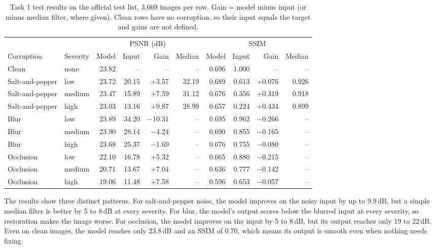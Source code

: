 \documentclass[conference]{IEEEtran}
\begin{document}
\begin{table}[t]
\centering
\caption{Task 1 test results on the official test list, 3{,}669 images per row. Gain = model minus
input (or minus median filter, where given). Clean rows have no corruption, so their input equals the
target and gains are not defined.}
\label{tab:t1results}
\small
\begin{tabular}{@{}llrrrrrrrr@{}}
\toprule
 & & \multicolumn{4}{c}{PSNR (dB)} & \multicolumn{4}{c}{SSIM} \\
\cmidrule(lr){3-6}\cmidrule(lr){7-10}
Corruption & Severity & Model & Input & Gain & Median & Model & Input & Gain & Median \\
\midrule
Clean & none & 23.82 & -- & -- & -- & 0.696 & 1.000 & -- & -- \\
Salt-and-pepper & low & 23.72 & 20.15 & +3.57 & 32.19 & 0.689 & 0.613 & +0.076 & 0.926 \\
Salt-and-pepper & medium & 23.47 & 15.89 & +7.59 & 31.12 & 0.676 & 0.356 & +0.319 & 0.918 \\
Salt-and-pepper & high & 23.03 & 13.16 & +9.87 & 28.99 & 0.657 & 0.224 & +0.434 & 0.899 \\
Blur & low & 23.89 & 34.20 & $-$10.31 & -- & 0.695 & 0.962 & $-$0.266 & -- \\
Blur & medium & 23.90 & 28.14 & $-$4.24 & -- & 0.690 & 0.855 & $-$0.165 & -- \\
Blur & high & 23.68 & 25.37 & $-$1.69 & -- & 0.676 & 0.755 & $-$0.080 & -- \\
Occlusion & low & 22.10 & 16.78 & +5.32 & -- & 0.665 & 0.880 & $-$0.215 & -- \\
Occlusion & medium & 20.71 & 13.67 & +7.04 & -- & 0.636 & 0.777 & $-$0.142 & -- \\
Occlusion & high & 19.06 & 11.48 & +7.58 & -- & 0.596 & 0.653 & $-$0.057 & -- \\
\bottomrule
\end{tabular}
\end{table}

The results show three distinct patterns. For salt-and-pepper noise, the model improves on the noisy input
by up to 9.9\,dB, but a simple median filter is better by 5 to 8\,dB at every severity. For blur, the
model's output scores below the blurred input at every severity, so restoration makes the image worse. For
occlusion, the model improves on the input by 5 to 8\,dB, but its output reaches only 19 to 22\,dB. Even on clean
images, the model reaches only 23.8\,dB and an SSIM of 0.70, which means its output is smooth even when
nothing needs fixing.
\end{document}
